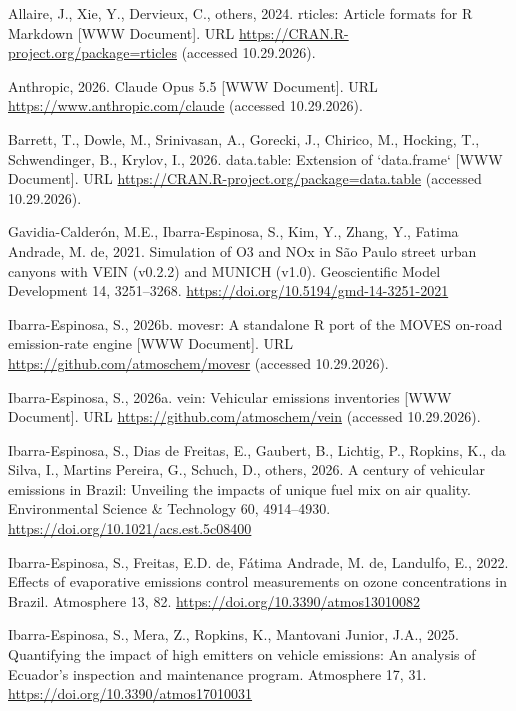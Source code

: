 \documentclass[preprint,
3p]{elsarticle} %
\newlength{\cslhangindent}
\newenvironment{CSLReferences}[2] %
 {\begin{list}{}{%
  \setlength{\itemindent}{0pt}
  \setlength{\leftmargin}{0pt}
  \setlength{\parsep}{0pt}
  \ifodd #1
   \setlength{\leftmargin}{\cslhangindent}
   \setlength{\itemindent}{-1\cslhangindent}
  \fi
  \setlength{\itemsep}{#2\baselineskip}}}
 {\end{list}}
\begin{document}
\label{refs}
\begin{CSLReferences}{1}{0}
Allaire, J., Xie, Y., Dervieux, C., others, 2024. {rticles}: Article
formats for {R Markdown} {[}WWW Document{]}. URL
\url{https://CRAN.R-project.org/package=rticles} (accessed 10.29.2026).

Anthropic, 2026. {Claude Opus 5.5} {[}WWW Document{]}. URL
\url{https://www.anthropic.com/claude} (accessed 10.29.2026).

Barrett, T., Dowle, M., Srinivasan, A., Gorecki, J., Chirico, M.,
Hocking, T., Schwendinger, B., Krylov, I., 2026. {data.table}: Extension
of `data.frame` {[}WWW Document{]}. URL
\url{https://CRAN.R-project.org/package=data.table} (accessed
10.29.2026).

Gavidia-Calderón, M.E., Ibarra-Espinosa, S., Kim, Y., Zhang, Y., Fatima
Andrade, M. de, 2021. Simulation of {O3} and {NOx} in {S}{ã}o {P}aulo
street urban canyons with {VEIN} (v0.2.2) and {MUNICH} (v1.0).
Geoscientific Model Development 14, 3251--3268.
\url{https://doi.org/10.5194/gmd-14-3251-2021}

Ibarra-Espinosa, S., 2026b. {movesr}: A standalone {R} port of the
{MOVES} on-road emission-rate engine {[}WWW Document{]}. URL
\url{https://github.com/atmoschem/movesr} (accessed 10.29.2026).

Ibarra-Espinosa, S., 2026a. {vein}: Vehicular emissions inventories
{[}WWW Document{]}. URL \url{https://github.com/atmoschem/vein}
(accessed 10.29.2026).

Ibarra-Espinosa, S., Dias de Freitas, E., Gaubert, B., Lichtig, P.,
Ropkins, K., da Silva, I., Martins Pereira, G., Schuch, D., others,
2026. A century of vehicular emissions in {B}razil: Unveiling the
impacts of unique fuel mix on air quality. Environmental Science \&
Technology 60, 4914--4930. \url{https://doi.org/10.1021/acs.est.5c08400}

Ibarra-Espinosa, S., Freitas, E.D. de, Fátima Andrade, M. de, Landulfo,
E., 2022. Effects of evaporative emissions control measurements on ozone
concentrations in {B}razil. Atmosphere 13, 82.
\url{https://doi.org/10.3390/atmos13010082}

Ibarra-Espinosa, S., Mera, Z., Ropkins, K., Mantovani Junior, J.A.,
2025. Quantifying the impact of high emitters on vehicle emissions: An
analysis of {E}cuador's inspection and maintenance program. Atmosphere
17, 31. \url{https://doi.org/10.3390/atmos17010031}


\end{CSLReferences}
\end{document}
